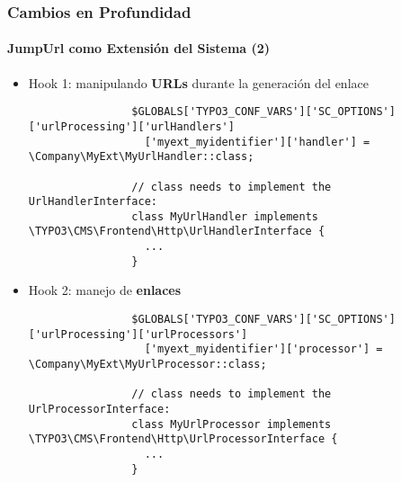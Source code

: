 
\begin{frame}[fragile]
	\frametitle{Cambios en Profundidad}
	\framesubtitle{JumpUrl como Extensión del Sistema (2)}

	\lstset{basicstyle=\tiny\ttfamily}

	\begin{itemize}

		\item Hook 1: manipulando \textbf{URLs} durante la generación del enlace

			\begin{lstlisting}
				$GLOBALS['TYPO3_CONF_VARS']['SC_OPTIONS']['urlProcessing']['urlHandlers']
				  ['myext_myidentifier']['handler'] = \Company\MyExt\MyUrlHandler::class;

				// class needs to implement the UrlHandlerInterface:
				class MyUrlHandler implements \TYPO3\CMS\Frontend\Http\UrlHandlerInterface {
				  ...
				}
			\end{lstlisting}

		\item Hook 2: manejo de \textbf{enlaces}

			\begin{lstlisting}
				$GLOBALS['TYPO3_CONF_VARS']['SC_OPTIONS']['urlProcessing']['urlProcessors']
				  ['myext_myidentifier']['processor'] = \Company\MyExt\MyUrlProcessor::class;

				// class needs to implement the UrlProcessorInterface:
				class MyUrlProcessor implements \TYPO3\CMS\Frontend\Http\UrlProcessorInterface {
				  ...
				}
			\end{lstlisting}

	\end{itemize}

\end{frame}


